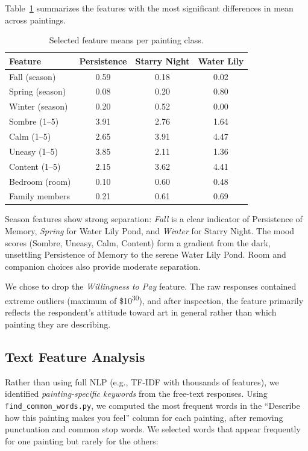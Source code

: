 \documentclass[12pt]{article}
\begin{document}
Table~\ref{tab:eda} summarizes the features with the most significant differences in mean across paintings.

\begin{table}[H]
\centering
\caption{Selected feature means per painting class.}
\label{tab:eda}
\small
\begin{tabular}{lccc}
\toprule
\textbf{Feature} & \textbf{Persistence} & \textbf{Starry Night} & \textbf{Water Lily} \\
\midrule
Fall (season)        & 0.59 & 0.18 & 0.02 \\
Spring (season)      & 0.08 & 0.20 & 0.80 \\
Winter (season)      & 0.20 & 0.52 & 0.00 \\
Sombre (1--5)        & 3.91 & 2.76 & 1.64 \\
Calm (1--5)          & 2.65 & 3.91 & 4.47 \\
Uneasy (1--5)        & 3.85 & 2.11 & 1.36 \\
Content (1--5)       & 2.15 & 3.62 & 4.41 \\
Bedroom (room)       & 0.10 & 0.60 & 0.48 \\
Family members       & 0.21 & 0.61 & 0.69 \\
\bottomrule
\end{tabular}
\end{table}

Season features show strong separation: \textit{Fall} is a clear indicator of Persistence of Memory, \textit{Spring} for Water Lily Pond, and \textit{Winter} for Starry Night. The mood scores (Sombre, Uneasy, Calm, Content) form a gradient from the dark, unsettling Persistence of Memory to the serene Water Lily Pond. Room and companion choices also provide moderate separation.

We chose to drop the \textit{Willingness to Pay} feature. The raw responses contained extreme outliers (maximum of \$10\textsuperscript{30}), and after inspection, the feature primarily reflects the respondent's attitude toward art in general rather than which painting they are describing.

\subsection*{Text Feature Analysis}

Rather than using full NLP (e.g., TF-IDF with thousands of features), we identified \textit{painting-specific keywords} from the free-text responses. Using \texttt{find\_common\_words.py}, we computed the most frequent words in the ``Describe how this painting makes you feel'' column for each painting, after removing punctuation and common stop words. We selected words that appear frequently for one painting but rarely for the others:
\end{document}
